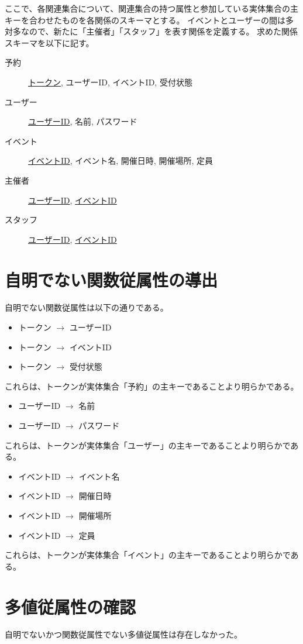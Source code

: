\documentclass[dvipdfmx]{jarticle}
\begin{document}
ここで、各関連集合について、関連集合の持つ属性と参加している実体集合の主キーを合わせたものを各関係のスキーマとする。
イベントとユーザーの間は多対多なので、新たに「主催者」「スタッフ」を表す関係を定義する。
求めた関係スキーマを以下に記す。

\begin{description}
  \item[予約] \underline{トークン}, ユーザーID, イベントID, 受付状態
  \item[ユーザー] \underline{ユーザーID}, 名前, パスワード
  \item[イベント] \underline{イベントID}, イベント名, 開催日時, 開催場所, 定員
  \item[主催者] \underline{ユーザーID}, \underline{イベントID}  
  \item[スタッフ] \underline{ユーザーID}, \underline{イベントID}
\end{description}

\section{自明でない関数従属性の導出}
自明でない関数従属性は以下の通りである。
\begin{itemize}
  \item {トークン} $\rightarrow$ {ユーザーID}
  \item {トークン} $\rightarrow$ {イベントID}
  \item {トークン} $\rightarrow$ {受付状態}
\end{itemize}
これらは、トークンが実体集合「予約」の主キーであることより明らかである。
\begin{itemize}
  \item {ユーザーID} $\rightarrow$ {名前}
  \item {ユーザーID} $\rightarrow$ {パスワード}
\end{itemize}
これらは、トークンが実体集合「ユーザー」の主キーであることより明らかである。
\begin{itemize}
  \item {イベントID} $\rightarrow$ {イベント名}
  \item {イベントID} $\rightarrow$ {開催日時}
  \item {イベントID} $\rightarrow$ {開催場所}
  \item {イベントID} $\rightarrow$ {定員}
\end{itemize}
これらは、トークンが実体集合「イベント」の主キーであることより明らかである。
\section{多値従属性の確認}
自明でないかつ関数従属性でない多値従属性は存在しなかった。
\end{document}
